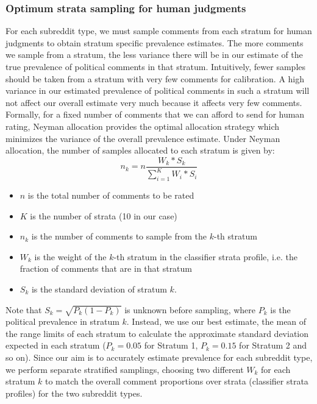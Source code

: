 \documentclass[letterpaper]{article} %
\begin{document}
\subsubsection{Optimum strata sampling for human judgments}
For each subreddit type, we must sample comments from each stratum for human judgments to obtain stratum specific prevalence estimates. The more comments we sample from a stratum, the less variance there will be in our estimate of the true prevalence of political comments in that stratum.
Intuitively, fewer samples should be taken from a stratum with very few comments for calibration. A high variance in our estimated prevalence of political comments in such a stratum will not affect our overall estimate very much because it affects very few comments.
Formally, for a fixed number of comments that we can afford to send for human rating, Neyman allocation provides the optimal allocation strategy which minimizes the variance of the overall prevalence estimate. Under Neyman allocation, the number of samples allocated to each stratum is given by:
 \begin{displaymath}
n_k = n\frac{W_k * S_k}{\sum_{i=1}^{K}W_i * S_i}
\end{displaymath}
\begin{itemize}
    \item $n$ is the total number of comments to be rated
    \item $K$ is the number of strata (10 in our case)
    \item $n_k$ is the number of comments to sample from the $k$-th stratum
    \item $W_k$ is the weight of the $k$-th stratum in the classifier strata profile, i.e. the fraction of comments that are in that stratum
    \item $S_k$ is the standard deviation of stratum $k$.
\end{itemize}
Note that $S_k = \sqrt{P_k(1-P_k)}$ is unknown before sampling, where $P_k$ is the political prevalence in stratum $k$. Instead, we use our best estimate, the mean of the range limits of each stratum to calculate the approximate standard deviation expected in each stratum ($P_k = 0.05$ for Stratum 1, $P_k = 0.15$ for Stratum 2 and so on). Since our aim is to accurately estimate prevalence for each subreddit type, we perform separate stratified samplings, choosing two different $W_k$ for each stratum $k$ to match the overall comment proportions over strata (classifier strata profiles) for the two subreddit types.
\end{document}
